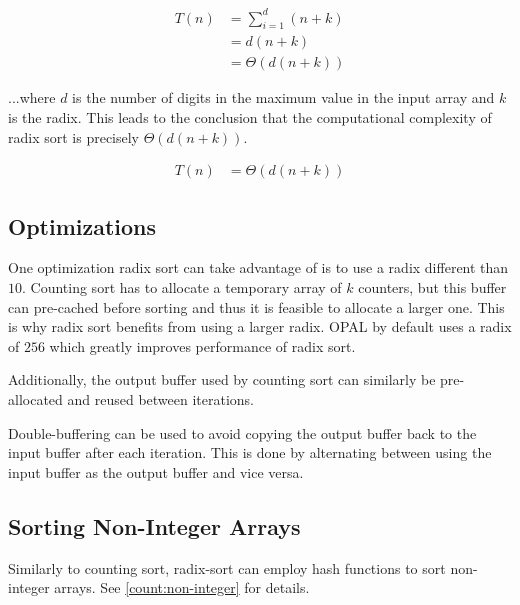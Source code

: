 \begin{equation*}
    \begin{aligned}
        T(n) &= \sum_{i = 1}^{d} (n + k) \\
        &= d(n + k) \\
        &= \Theta(d(n + k))
    \end{aligned}
\end{equation*}

...where $d$ is the number of digits in the maximum value in the input array and $k$ is the radix. This leads to the conclusion that the computational complexity of radix sort is precisely $\Theta(d(n + k))$.

\begin{equation*}
    \begin{aligned}
        T(n) &= \Theta(d(n + k))
    \end{aligned}
\end{equation*}

\subsection{Optimizations}

One optimization radix sort can take advantage of is to use a radix different than $10$. Counting sort has to allocate a temporary array of $k$ counters, but this buffer can pre-cached before sorting and thus it is feasible to allocate a larger one. This is why radix sort benefits from using a larger radix. OPAL by default uses a radix of $256$ which greatly improves performance of radix sort.

Additionally, the output buffer used by counting sort can similarly be pre-allocated and reused between iterations.

Double-buffering can be used to avoid copying the output buffer back to the input buffer after each iteration. This is done by alternating between using the input buffer as the output buffer and vice versa.

\subsection{Sorting Non-Integer Arrays}

Similarly to counting sort, radix-sort can employ hash functions to sort non-integer arrays. See \ref{count:non-integer} for details.